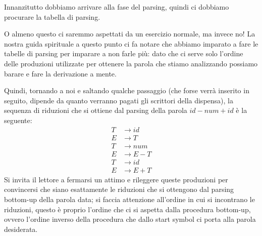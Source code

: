 \documentclass[class=book, crop=false, oneside, 12pt]{standalone}
\begin{document}
\noindent Innanzitutto dobbiamo arrivare alla fase del parsing, quindi ci dobbiamo procurare la tabella di parsing.

\noindent O almeno questo ci saremmo aspettati da un esercizio normale, ma invece no! La nostra guida spirituale a questo punto ci fa notare che abbiamo imparato a fare le tabelle di parsing per imparare a non farle più: dato che ci serve solo l'ordine delle produzioni utilizzate per ottenere la parola che stiamo analizzando possiamo barare e fare la derivazione a mente.

Quindi, tornando a noi e saltando qualche passaggio (che forse verrà inserito in seguito, dipende da quanto verranno pagati gli scrittori della dispensa), la sequenza di riduzioni che si ottiene dal parsing della parola \(id-num+id\) è la seguente:
\begin{align*}
    T &\to id \\
    E &\to T \\
    T &\to num \\
    E &\to E-T \\
    T &\to id \\
    E &\to E+T
\end{align*}
Si invita il lettore a fermarsi un attimo e rileggere queste produzioni per convincersi che siano esattamente le riduzioni che si ottengono dal parsing bottom-up della parola data; si faccia attenzione all'ordine in cui si incontrano le riduzioni, questo è proprio l'ordine che ci si aspetta dalla procedura bottom-up, ovvero l'ordine inverso della procedura che dallo start symbol ci porta alla parola desiderata.
\end{document}

